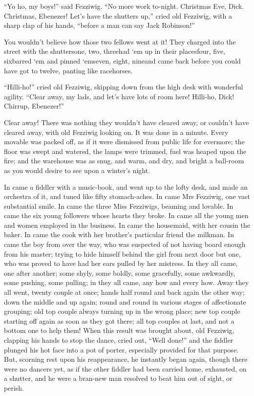 \documentclass[paper=5.5in:8.5in,BCOR=7mm,twoside,DIV=calc,12pt,usegeometry]{scrbook} %
\begin{document}
\enquote{Yo ho, my boys!} said Fezziwig. \enquote{No more work to-night. Christmas Eve, Dick. Christmas, Ebenezer! Let's have the shutters up,} cried old Fezziwig, with a sharp clap of his hands, \enquote{before a man can say Jack Robinson!}

You wouldn't believe how those two fellows went at it! They charged into the street with the shutters\textemdash one, two, three\textemdash had `em up in their places\textemdash four, five, six\textemdash barred `em and pinned `em\textemdash seven, eight, nine\textemdash and came back before you could have got to twelve, panting like racehorses.

\enquote{Hilli-ho!} cried old Fezziwig, skipping down from the high desk with wonderful agility. \enquote{Clear away, my lads, and let's have lots of room here! Hilli-ho, Dick! Chirrup, Ebenezer!}

Clear away! There was nothing they wouldn't have cleared away, or couldn't have cleared away, with old Fezziwig looking on. It was done in a minute. Every movable was packed off, as if it were dismissed from public life for evermore; the floor was swept and watered, the lamps were trimmed, fuel was heaped upon the fire; and the warehouse was as snug, and warm, and dry, and bright a ball-room as you would desire to see upon a winter's night.

In came a fiddler with a music-book, and went up to the lofty desk, and made an orchestra of it, and tuned like fifty stomach-aches. In came Mrs Fezziwig, one vast substantial smile. In came the three Miss Fezziwigs, beaming and lovable. In came the six young followers whose hearts they broke. In came all the young men and women employed in the business. In came the housemaid, with her cousin the baker. In came the cook with her broth\-er's particular friend the milkman. In came the boy from over the way, who was suspected of not having board enough from his master; trying to hide himself behind the girl from next door but one, who was proved to have had her ears pulled by her mistress. In they all came, one after another; some shyly, some boldly, some gracefully, some awkwardly, some pushing, some pulling; in they all came, any how and every how. Away they all went, twenty couple at once; hands half round and back again the other way; down the middle and up again; round and round in various stages of affectionate grouping; old top couple always turning up in the wrong place; new top couple starting off again as soon as they got there; all top couples at last, and not a bottom one to help them! When this result was brought about, old Fezziwig, clapping his hands to stop the dance, cried out, \enquote{Well done!} and the fiddler plunged his hot face into a pot of porter, especially provided for that purpose. But, scorning rest upon his reappearance, he instantly began again, though there were no dancers yet, as if the other fiddler had been carried home, exhausted, on a shutter, and he were a bran-new man resolved to beat him out of sight, or perish.
\end{document}
